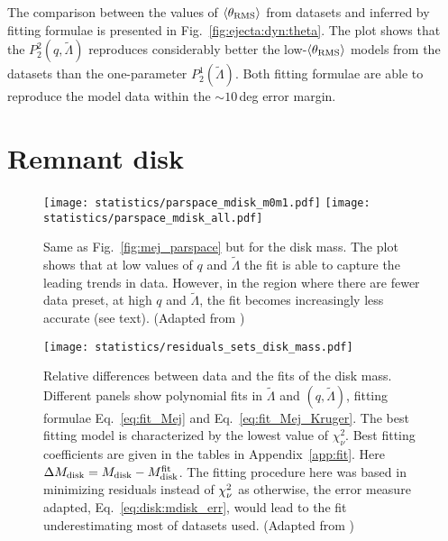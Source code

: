 The comparison between the values of $\langle\theta_{\rm RMS}\rangle$ from datasets and inferred by 
fitting formulae is presented in Fig.~\ref{fig:ejecta:dyn:theta}.
The plot shows that the $P_2^2(q,\tilde{\Lambda})$ reproduces considerably better 
the low-$\langle\theta_{\rm RMS}\rangle$ models from the datasets than the one-parameter $P_2^1(\tilde{\Lambda})$.
Both fitting formulae are able to reproduce the model data within the ${\sim}10\,$deg
error margin.
%


\section{Remnant disk}
\label{sec:stat:remdisk}

\begin{figure}[t]
    \centering 
    \texttt{[image: statistics/parspace\_mdisk\_m0m1.pdf]}
    \texttt{[image: statistics/parspace\_mdisk\_all.pdf]}
    \caption{
        Same as Fig.~\ref{fig:mej_parspace} but for the disk mass.
        The plot shows that at low values of $q$ and $\tilde{\Lambda}$ the fit 
        is able to capture the leading trends in data. However, in the region where 
        there are fewer data preset, at high $q$ and $\tilde{\Lambda}$, the fit 
        becomes increasingly less accurate (see text).
        (Adapted from \citet{Nedora:2020qtd})
    }
    \label{fig:mdisk_parspace}
\end{figure}
%
\begin{figure}[t]
    \centering 
    \texttt{[image: statistics/residuals\_sets\_disk\_mass.pdf]}
    \caption{
        Relative differences between data and the fits of the disk mass. 
        Different panels show polynomial fits in $\tilde{\Lambda}$ and 
        $(q,\tilde{\Lambda})$, fitting formulae Eq.~\eqref{eq:fit_Mej} and 
        Eq.~\eqref{eq:fit_Mej_Kruger}. 
        The best fitting model is characterized by the lowest value of $\chi_{\nu}^2$.
        Best fitting coefficients are given in the tables in Appendix~\ref{app:fit}.
        Here $\Delta M_{\rm disk} = M_{\rm disk} - M^{\rm fit}_{\rm disk}$.
        The fitting procedure here was based in minimizing residuals instead 
        of $\chi_{\nu}^2$ as otherwise, the error measure adapted, 
        Eq.~\eqref{eq:disk:mdisk_err}, would lead to the 
        fit underestimating most of datasets used.
        (Adapted from \citet{Nedora:2020qtd})
    }
    \label{fig:stat_mdisk}
\end{figure}

